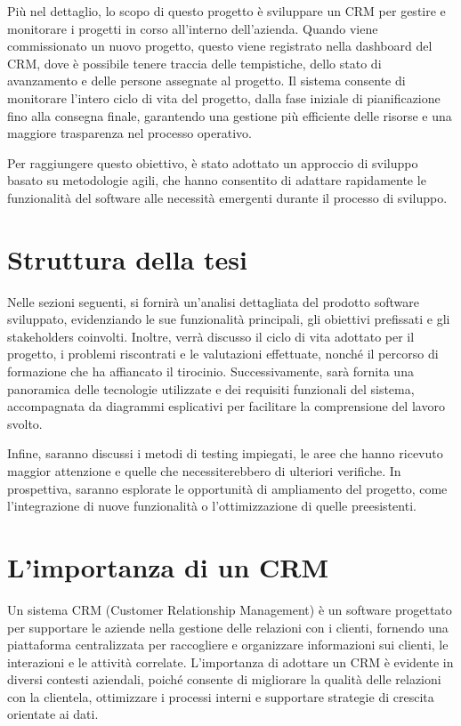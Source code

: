 \documentclass[target=bach,aauheader=,style=]{thud}
\begin{document}
\noindent  Più nel dettaglio, lo scopo di questo progetto è sviluppare un CRM per gestire e monitorare i progetti in corso all'interno dell'azienda. Quando viene commissionato un nuovo progetto, questo viene registrato nella dashboard del CRM, dove è possibile tenere traccia delle tempistiche, dello stato di avanzamento e delle persone assegnate al progetto. Il sistema consente di monitorare l'intero ciclo di vita del progetto, dalla fase iniziale di pianificazione fino alla consegna finale, garantendo una gestione più efficiente delle risorse e una maggiore trasparenza nel processo operativo.

\noindent Per raggiungere questo obiettivo, è stato adottato un approccio di sviluppo basato su metodologie agili, che hanno consentito di adattare rapidamente le funzionalità del software alle necessità emergenti durante il processo di sviluppo.


\section{Struttura della tesi}

Nelle sezioni seguenti, si fornirà un'analisi dettagliata del prodotto software sviluppato, evidenziando le sue funzionalità principali, gli obiettivi prefissati e gli stakeholders coinvolti. Inoltre, verrà discusso il ciclo di vita adottato per il progetto, i problemi riscontrati e le valutazioni effettuate, nonché il percorso di formazione che ha affiancato il tirocinio. Successivamente, sarà fornita una panoramica delle tecnologie utilizzate e dei requisiti funzionali del sistema, accompagnata da diagrammi esplicativi per facilitare la comprensione del lavoro svolto. 

\noindent Infine, saranno discussi i metodi di testing impiegati, le aree che hanno ricevuto maggior attenzione e quelle che necessiterebbero di ulteriori verifiche. In prospettiva, saranno esplorate le opportunità di ampliamento del progetto, come l'integrazione di nuove funzionalità o l'ottimizzazione di quelle preesistenti. 

\section{L'importanza di un CRM}
Un sistema CRM (Customer Relationship Management) è un software progettato per supportare le aziende nella gestione delle relazioni con i clienti, fornendo una piattaforma centralizzata per raccogliere e organizzare informazioni sui clienti, le interazioni e le attività correlate. L'importanza di adottare un CRM è evidente in diversi contesti aziendali, poiché consente di migliorare la qualità delle relazioni con la clientela, ottimizzare i processi interni e supportare strategie di crescita orientate ai dati. 
\end{document}
